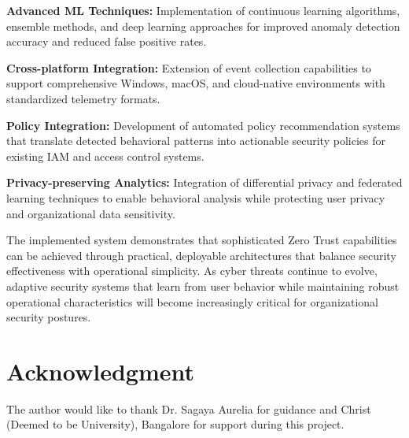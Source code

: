 \documentclass[conference]{IEEEtran}
\begin{document}
\textbf{Advanced ML Techniques:} Implementation of continuous learning algorithms, ensemble methods, and deep learning approaches for improved anomaly detection accuracy and reduced false positive rates.

\textbf{Cross-platform Integration:} Extension of event collection capabilities to support comprehensive Windows, macOS, and cloud-native environments with standardized telemetry formats.

\textbf{Policy Integration:} Development of automated policy recommendation systems that translate detected behavioral patterns into actionable security policies for existing IAM and access control systems.

\textbf{Privacy-preserving Analytics:} Integration of differential privacy and federated learning techniques to enable behavioral analysis while protecting user privacy and organizational data sensitivity.

The implemented system demonstrates that sophisticated Zero Trust capabilities can be achieved through practical, deployable architectures that balance security effectiveness with operational simplicity. As cyber threats continue to evolve, adaptive security systems that learn from user behavior while maintaining robust operational characteristics will become increasingly critical for organizational security postures.

\section*{Acknowledgment}
The author would like to thank Dr. Sagaya Aurelia for guidance and Christ (Deemed to be University), Bangalore for support during this project.
\end{document}
